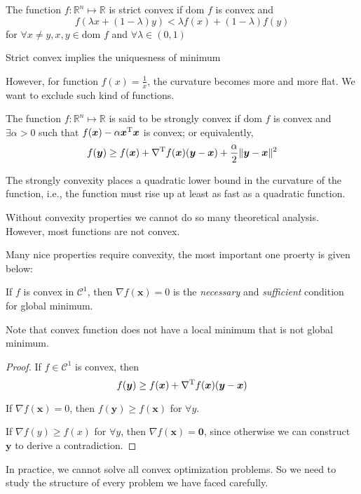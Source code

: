 \begin{definition}
The function $f:\mathbb{R}^n\mapsto\mathbb{R}$ is strict convex if $\mbox{dom }f$ is convex and
\[
f(\lambda x+ (1-\lambda)y)<\lambda f(x) + (1-\lambda) f(y)
\]
for $\forall x\ne y, x,y\in\mbox{dom }f$ and $\forall \lambda\in(0,1)$
\end{definition}
\begin{remark}
Strict convex implies the uniquesness of minimum
\end{remark}
However, for function $f(x)=\frac{1}{x}$, the curvature becomes more and more flat. We want to exclude such kind of functions.
\begin{definition}
The function $f:\mathbb{R}^n\mapsto\mathbb{R}$ is said to be strongly convex if $\mbox{dom }f$ is convex and $\exists\alpha>0$ such that $f(\bm x) - \alpha\bm x^{\mathrm T}\bm x$ is convex; or equivalently,
\[
f(\bm y)\ge f(\bm x) + \nabla^{\mathrm T} f(\bm x)(\bm y-\bm x) + \frac{\alpha}{2}\|\bm y-\bm x\|^2
\]
\end{definition}
The strongly convexity places a quadratic lower bound in the curvature of the function, i.e., the function must rise up at least as fast as a quadratic function.

Without convexity properties we cannot do so many theoretical analysis. However, most functions are not convex. 

Many nice properties require convexity, the most important one proerty is given below:
\begin{theorem}
If $f$ is convex in $\mathcal{C}^1$, then $\nabla f(\bm x)=0$ is the \emph{necessary} and \emph{sufficient} condition for global minimum.
\end{theorem}
Note that convex function does not have a local minimum that is not global minimum.
\begin{proof}
If $f\in\mathcal{C}^1$ is convex, then 
\[
f(\bm y)\ge f(\bm x)+\nabla^{\mathrm T} f(\bm x)(\bm y-\bm x)
\]

If $\nabla f(\bm x)=0$, then $f(\bm y)\ge f(\bm x)$ for $\forall y$.

If $\nabla f(y)\ge f(x)$ for $\forall y$, then $\nabla f(\bm x)=\bm0$, since otherwise we can construct $\bm y$ to derive a contradiction.
\end{proof}

In practice, we cannot solve all convex optimization problems. So we need to study the structure of every problem we have faced carefully. 








